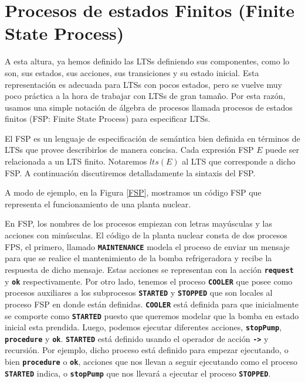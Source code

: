 \section{Procesos de estados Finitos (Finite State Process)}

A esta altura, ya hemos definido las LTSs definiendo sus componentes, como lo son, sus estados, sus acciones, sus
transiciones y su estado inicial. Esta representación es adecuada para LTSs con pocos estados, pero se vuelve muy poco
práctica a la hora de trabajar con LTSs de gran tamaño. Por esta razón, usamos una simple notación de álgebra de
procesos llamada procesos de estados finitos (FSP: Finite State Process) para especificar LTSs.
\cite{644733,Magee:2000:CSM:332036}

El FSP es un lenguaje de especificación de semántica bien definida en términos de LTSs que provee describirlos de
manera concisa. Cada expresión FSP $E$ puede ser relacionada a un LTS finito. Notaremos $lts(E)$ al LTS que corresponde a dicho FSP.
A continuación discutiremos detalladamente la sintaxis del FSP.

A modo de ejemplo, en la Figura \ref{FSP}, mostramos un código FSP que representa el funcionamiento de una planta nuclear.

En FSP, los nombres de los procesos empiezan con letras mayúsculas y las acciones con minúsculas. El código de la planta
nuclear consta de dos procesos FPS, el primero, llamado \texttt{\textbf{MAINTENANCE}} modela el proceso de enviar un
mensaje para que se realice el mantenimiento de la bomba refrigeradora y recibe la respuesta de dicho mensaje. Estas
acciones se representan con la acción \texttt{\textbf{request}} y \texttt{\textbf{ok}} respectivamente. Por otro lado,
tenemos el proceso \texttt{\textbf{COOLER}} que posee como procesos auxiliares a los subprocesos \texttt{\textbf{STARTED}}
y \texttt{\textbf{STOPPED}} que son locales al proceso FSP en donde están definidas. \texttt{\textbf{COOLER}} está
definida para que inicialmente se comporte como \texttt{\textbf{STARTED}} puesto que queremos modelar que la bomba en
estado inicial esta prendida. Luego, podemos ejecutar diferentes acciones, \texttt{\textbf{stopPump}},
\texttt{\textbf{procedure}} y \texttt{\textbf{ok}}. \texttt{\textbf{STARTED}} está definido usando el operador de acción 
\texttt{\textbf{->}} y recursión. Por ejemplo, dicho proceso está definido para empezar ejecutando, o bien \texttt{\textbf{procedure}}
o \texttt{\textbf{ok}}, acciones que nos llevan a seguir ejecutando como el proceso \texttt{\textbf{STARTED}} indica, o
\texttt{\textbf{stopPump}} que nos llevará a ejecutar el proceso \texttt{\textbf{STOPPED}}.

